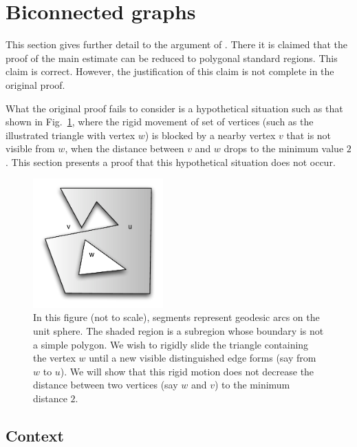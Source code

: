 \documentclass[11pt]{amsart}
\begin{document}
\section{Biconnected graphs}
\label{sec:biconnected}


This section gives further detail to the argument of \cite[\S12.7~p.131]{Hales:2006:DCG}.  There it is claimed that
the proof of the main estimate \cite[Theorem~12.1]{Hales:2006:DCG} can be reduced to polygonal standard regions.
This claim is correct. 
However, the justification of this claim is not complete in the original proof. 

What the original proof fails to consider
is a hypothetical situation such as that shown in Fig.~\ref{fig:biconnected}, where the rigid movement of set of vertices (such as the illustrated triangle with vertex $w$)
is blocked by a nearby vertex $v$ that is not visible from $w$, when the distance between $v$ and $w$ drops
to the minimum value $2$. This section presents a proof that this hypothetical situation does
not occur.



\begin{figure}
\begin{center}
\includegraphics[width=5cm]{biconnected}
\end{center}
\caption{In this figure (not to scale), segments represent geodesic arcs on the unit sphere.  The shaded region is a subregion whose boundary is not a simple polygon.
We wish to rigidly slide the triangle containing the vertex $w$ until a new visible distinguished edge forms
(say from $w$ to $u$).  We will show that this rigid motion does not decrease the distance between
two vertices (say $w$ and $v$)  to the minimum distance $2$.}
\label{fig:biconnected}
\end{figure}


\subsection*{Context}
\end{document}
